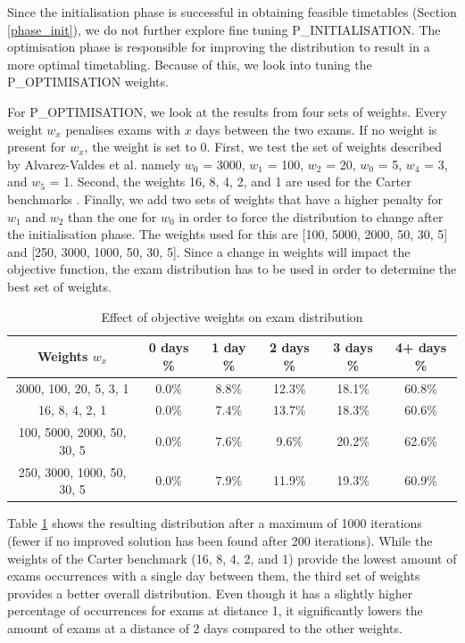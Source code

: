 Since the initialisation phase is successful in obtaining feasible timetables (Section \ref{phase_init}), we do not further explore fine tuning P\_INITIALISATION. The optimisation phase is responsible for improving the distribution to result in a more optimal timetabling. Because of this, we look into tuning the P\_OPTIMISATION weights.

For P\_OPTIMISATION, we look at the results from four sets of weights. Every weight $w_x$ penalises exams with $x$ days between the two exams. If no weight is present for $w_x$, the weight is set to 0.  First, we test the set of weights described by Alvarez-Valdes et al. namely $w_0$ = 3000, $w_1$ = 100, $w_2$ = 20, $w_0$ = 5, $w_4$ = 3, and $w_5$ = 1. Second, the weights 16, 8, 4, 2, and 1 are used for the Carter benchmarks \cite{carter1996}. Finally, we add two sets of weights that have a higher penalty for $w_1$ and $w_2$ than the one for $w_0$ in order to force the distribution to change after the initialisation phase. The weights used for this are [100, 5000, 2000, 50, 30, 5] and [250, 3000, 1000, 50, 30, 5]. Since a change in weights will impact the objective function, the exam distribution has to be used in order to determine the best set of weights.

\begin{table}[h]
	\caption{Effect of objective weights on exam distribution}
	\label{tab:weights_distr}
	\centering
	\begin{tabular}{c c c c c c}
		\hline
  	\textbf{Weights $w_x$}	&
   \textbf{0 days \% } &
    \textbf{1 day \% } & 
    \textbf{2 days \% } &
    \textbf{3 days \% } & 
    \textbf{4+ days \%}\\ \hline
    3000, 100, 20, 5, 3, 1 & 0.0\% &  8.8\% & 12.3\% & 18.1\% & 60.8\% \\
    16, 8, 4, 2, 1 & 0.0\% & 7.4\% & 13.7\% & 18.3\% & 60.6\% \\
    100, 5000, 2000, 50, 30, 5 & 0.0\% & 7.6\% & 9.6\% & 20.2\% & 62.6\% \\
    250, 3000, 1000, 50, 30, 5 & 0.0\% &  7.9\% & 11.9\% & 19.3\% & 60.9\% \\
        \hline%
	\end{tabular}
\end{table}

Table \ref{tab:weights_distr} shows the resulting distribution after a maximum of 1000 iterations (fewer if no improved solution has been found after 200 iterations). While the weights of the Carter benchmark (16, 8, 4, 2, and 1) provide the lowest amount of exams occurrences with a single day between them, the third set of weights provides a better overall distribution. Even though it has a slightly higher percentage of occurrences for exams at distance 1, it significantly lowers the amount of exams at a distance of 2 days compared to the other weights.


